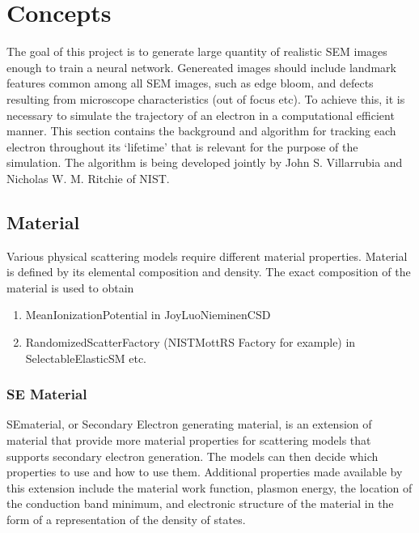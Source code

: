 \chapter{Concepts}\label{con}
The goal of this project is to generate large quantity of realistic SEM images enough to train a neural network. Genereated images should include landmark features common among all SEM images, such as edge bloom, and defects resulting from microscope characteristics (out of focus etc). To achieve this, it is necessary to simulate the trajectory of an electron in a computational efficient manner. This section contains the background and algorithm for tracking each electron throughout its `lifetime' that is relevant for the purpose of the simulation. The algorithm is being developed jointly by John S. Villarrubia and Nicholas W. M. Ritchie of NIST. 


\section{Material}\label{con:material}
Various physical scattering models require different material properties. Material is defined by its elemental composition and density. The exact composition of the material is used to obtain 
\begin{enumerate}
\item MeanIonizationPotential in JoyLuoNieminenCSD
\item RandomizedScatterFactory (NISTMottRS Factory for example) in SelectableElasticSM etc.
\end{enumerate}

\subsection{SE Material}\label{subsec:sematerial}
SEmaterial, or Secondary Electron generating material, is an extension of material that provide more material properties for scattering models that supports secondary electron generation. The models can then decide which properties to use and how to use them. Additional properties made available by this extension include the material work function, plasmon energy, the location of the conduction band minimum, and electronic structure of the material in the form of a representation of the density of states. 

